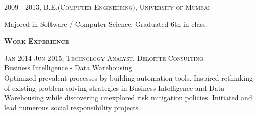 \documentclass[letterpaper,12pt,final]{memoir}
\newcommand{\SmallSep}{\vspace{0.5em}}
\newcommand{\CVSection}[1]
	{\Large\textbf{\textsc{{#1}}}\par
	\SmallSep\normalsize\normalfont}
\newcommand{\CVItem}[1]
	{\textsc{\color{Plum} #1}}
\begin{document}
\CVItem{2009 - 2013, B.E.(Computer Engineering), University of \allowbreak  Mumbai}\\
 \begin{footnotesize}
 	Majored in Software / Computer Science. Graduated 6th in class.
 \end{footnotesize}
\SmallSep

\CVSection{Work Experience}
\CVItem{Jan 2014 \textendash \space Jun 2015, Technology Analyst, Deloitte Consulting}\\
\SmallSep
Business Intelligence - Data Warehousing\\
{\footnotesize Optimized prevalent processes by building automation tools. Inspired rethinking of existing problem solving strategies in Business Intelligence and Data Warehousing while discovering unexplored risk mitigation policies. Initiated and lead numerous social responsibility projects.}
\SmallSep
\end{document}
